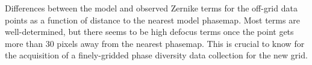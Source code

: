 Differences between the model and observed Zernike terms for the off-grid data points as a function of distance to the nearest model phasemap. Most terms are well-determined, but there seems to be high defocus terms once the point gets more than 30 pixels away from the nearest phasemap. This is crucial to know for the acquisition of a finely-gridded phase diversity data collection for the new grid. 
\label{fig:inst_phase_diff_zernike}  